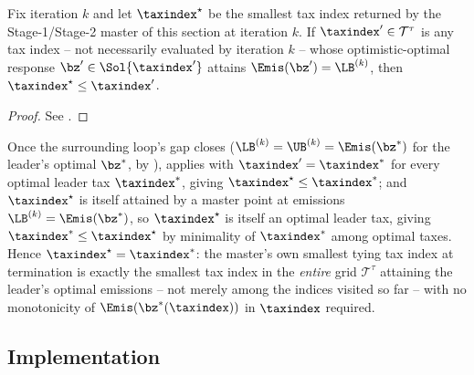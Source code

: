 \begin{lemma}\label{lem:tiebreak_validity}
Fix iteration $k$ and let $\taxindex^{\star}$ be the smallest tax index
returned by the Stage-1/Stage-2 master of this section at iteration
$k$. If $\taxindex'\in\mathcal{T}^{\tau}$ is any tax index -- not
necessarily evaluated by iteration $k$ -- whose optimistic-optimal
response $\bz'\in\Sol{\taxindex'}$ attains $\Emis(\bz')=\LB^{(k)}$, then
$\taxindex^{\star}\le\taxindex'$.
\end{lemma}

\begin{proof}
See .
\end{proof}

\begin{remark}
Once the surrounding \DBP loop's gap closes ($\LB^{(k)}=\UB^{(k)}=
\Emis(\bz^{*})$ for the leader's optimal $\bz^{*}$, by
),  applies with
$\taxindex'=\taxindex^{*}$ for every optimal leader tax $\taxindex^{*}$,
giving $\taxindex^{\star}\le\taxindex^{*}$; and $\taxindex^{\star}$ is itself
attained by a master point at emissions $\LB^{(k)}=\Emis(\bz^{*})$, so
$\taxindex^{\star}$ is itself an optimal leader tax, giving
$\taxindex^{*}\le\taxindex^{\star}$ by minimality of $\taxindex^{*}$ among
optimal taxes. Hence $\taxindex^{\star}=\taxindex^{*}$: the master's own
smallest tying tax index at termination is exactly the smallest tax
index in the \emph{entire} grid $\mathcal{T}^{\tau}$ attaining the
leader's optimal emissions -- not merely among the indices visited so
far -- with no monotonicity of $\Emis(\bz^{*}(\taxindex))$ in $\taxindex$
required.
\end{remark}

\subsection{Implementation}
\label{sec:method:implementation}

